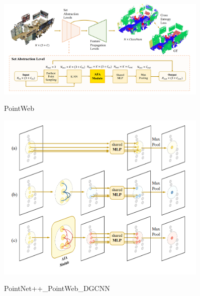 \documentclass[a4paper,12pt]{article}
\begin{document}
	\begin{figure}[H]
	\begin{center}
		\includegraphics[width=0.9\textwidth]{img/PointWeb.png} 
		\caption{PointWeb}
	\end{center}
\end{figure}

	\begin{figure}[H]
		\begin{center}
			\includegraphics[width=0.9\textwidth]{img/PointNet++_PointWeb_DGCNN.png} 
			\caption{PointNet++\_PointWeb\_DGCNN}
		\end{center}
	\end{figure}
\end{document}
